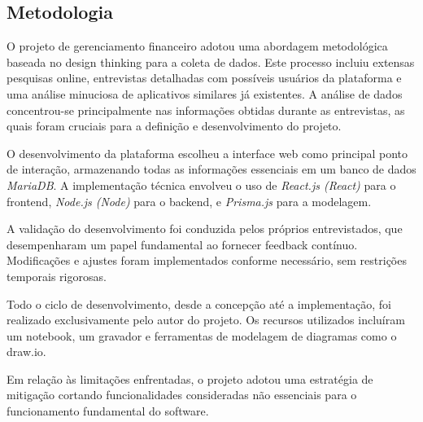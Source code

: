 \subsection{Metodologia}

O projeto de gerenciamento financeiro adotou uma abordagem metodológica baseada no design thinking para a coleta de dados. Este processo incluiu extensas pesquisas online, entrevistas detalhadas com possíveis usuários da plataforma e uma análise minuciosa de aplicativos similares já existentes. A análise de dados concentrou-se principalmente nas informações obtidas durante as entrevistas, as quais foram cruciais para a definição e desenvolvimento do projeto.

O desenvolvimento da plataforma escolheu a interface web como principal ponto de interação, armazenando todas as informações essenciais em um banco de dados \textit{MariaDB}. A implementação técnica envolveu o uso de \textit{React.js (React)} para o frontend, \textit{Node.js (Node)} para o backend, e \textit{Prisma.js} para a modelagem.

A validação do desenvolvimento foi conduzida pelos próprios entrevistados, que desempenharam um papel fundamental ao fornecer feedback contínuo. Modificações e ajustes foram implementados conforme necessário, sem restrições temporais rigorosas.

Todo o ciclo de desenvolvimento, desde a concepção até a implementação, foi realizado exclusivamente pelo autor do projeto. Os recursos utilizados incluíram um notebook, um gravador e ferramentas de modelagem de diagramas como o draw.io.

Em relação às limitações enfrentadas, o projeto adotou uma estratégia de mitigação cortando funcionalidades consideradas não essenciais para o funcionamento fundamental do software.